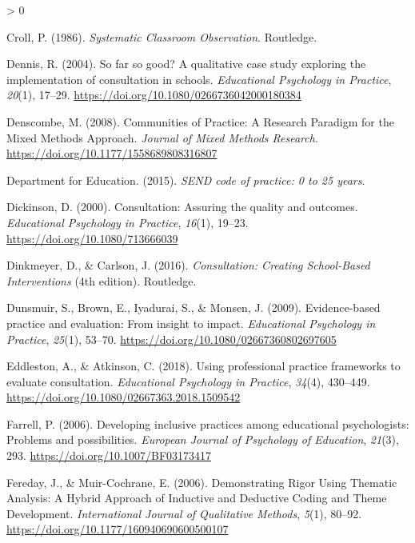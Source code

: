 \documentclass[
  english,
  man]{apa}
\newlength{\cslhangindent}
\newenvironment{CSLReferences}[2] %
 {%
  \setlength{\parindent}{0pt}
  \ifodd #1 \everypar{\setlength{\hangindent}{\cslhangindent}}\ignorespaces\fi
  \ifnum #2 > 0
  \setlength{\parskip}{#2\baselineskip}
  \fi
 }%
 {}
\begin{document}
\begin{CSLReferences}{1}{0}
\leavevmode\hypertarget{ref-crollSystematicClassroomObservation1986}{}%
Croll, P. (1986). \emph{Systematic {Classroom Observation}}. {Routledge}.

\leavevmode\hypertarget{ref-dennisFarGoodQualitative2004}{}%
Dennis, R. (2004). So far so good? {A} qualitative case study exploring the implementation of consultation in schools. \emph{Educational Psychology in Practice}, \emph{20}(1), 17--29. \url{https://doi.org/10.1080/0266736042000180384}

\leavevmode\hypertarget{ref-denscombeCommunitiesPracticeResearch2008}{}%
Denscombe, M. (2008). Communities of {Practice}: {A Research Paradigm} for the {Mixed Methods Approach}. \emph{Journal of Mixed Methods Research}. \url{https://doi.org/10.1177/1558689808316807}

\leavevmode\hypertarget{ref-departmentforeducationSENDCodePractice2015}{}%
Department for Education. (2015). \emph{{SEND} code of practice: 0 to 25 years}.

\leavevmode\hypertarget{ref-dickinsonConsultationAssuringQuality2000a}{}%
Dickinson, D. (2000). Consultation: {Assuring} the quality and outcomes. \emph{Educational Psychology in Practice}, \emph{16}(1), 19--23. \url{https://doi.org/10.1080/713666039}

\leavevmode\hypertarget{ref-dinkmeyerConsultationCreatingSchoolBased2016}{}%
Dinkmeyer, D., \& Carlson, J. (2016). \emph{Consultation: {Creating School}-{Based Interventions}} (4th edition). {Routledge}.

\leavevmode\hypertarget{ref-dunsmuirEvidenceBasedPractice2009}{}%
Dunsmuir, S., Brown, E., Iyadurai, S., \& Monsen, J. (2009). Evidence-based practice and evaluation: From insight to impact. \emph{Educational Psychology in Practice}, \emph{25}(1), 53--70. \url{https://doi.org/10.1080/02667360802697605}

\leavevmode\hypertarget{ref-eddlestonUsingProfessionalPractice2018}{}%
Eddleston, A., \& Atkinson, C. (2018). Using professional practice frameworks to evaluate consultation. \emph{Educational Psychology in Practice}, \emph{34}(4), 430--449. \url{https://doi.org/10.1080/02667363.2018.1509542}

\leavevmode\hypertarget{ref-farrellDevelopingInclusivePractices2006}{}%
Farrell, P. (2006). Developing inclusive practices among educational psychologists: {Problems} and possibilities. \emph{European Journal of Psychology of Education}, \emph{21}(3), 293. \url{https://doi.org/10.1007/BF03173417}

\leavevmode\hypertarget{ref-feredayDemonstratingRigorUsing2006}{}%
Fereday, J., \& Muir-Cochrane, E. (2006). Demonstrating {Rigor Using Thematic Analysis}: {A Hybrid Approach} of {Inductive} and {Deductive Coding} and {Theme Development}. \emph{International Journal of Qualitative Methods}, \emph{5}(1), 80--92. \url{https://doi.org/10.1177/160940690600500107}


\end{CSLReferences}
\end{document}
